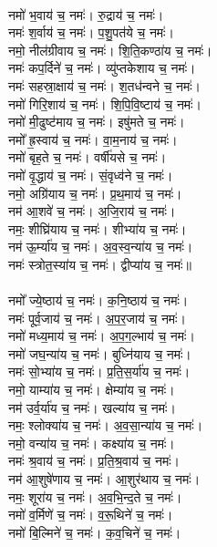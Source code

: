 \\
नमो॑ भ॒वाय॑ च॒ नमः॑। रु॒द्राय॑ च॒ नमः॑।\\
नमः॑ श॒र्वाय॑ च॒ नमः॑। प॒शु॒पत॑ये च॒ नमः॑।\\
नमो॒ नील॑ग्रीवाय च॒ नमः॑। शि॒ति॒कण्ठा॑य च॒ नमः॑।\\
नमः॑ कप॒र्दिने॑ च॒ नमः॑। व्यु॑प्तकेशाय च॒ नमः॑।\\
नमः॑ सहस्रा॒क्षाय॑ च॒ नमः॑। श॒तध॑न्वने च॒ नमः॑।\\
नमो॑ गिरि॒शाय॑ च॒ नमः॑। शि॒पि॒वि॒ष्टाय॑ च॒ नमः॑।\\
नमो॑ मी॒ढुष्ट॑माय च॒ नमः॑। इषु॑मते च॒ नमः॑।\\
नमो᳚ ह्र॒स्वाय॑ च॒ नमः॑। वा॒म॒नाय॑ च॒ नमः॑।\\
नमो॑ बृह॒ते च॒ नमः॑। वर्षी॑यसे च॒ नमः॑।\\
नमो॑ वृ॒द्धाय॑ च॒ नमः॑। सं॒वृध्व॑ने च॒ नमः॑।\\
नमो॒ अग्रि॑याय च॒ नमः॑। प्र॒थ॒माय॑ च॒ नमः॑।\\
नम॑ आ॒शवे॑ च॒ नमः॑। अ॒जि॒राय॑ च॒ नमः॑।\\
नमः॒ शीघ्रि॑याय च॒ नमः॑। शीभ्या॑य च॒ नमः॑।\\
नम॑ ऊ॒र्म्या॑य च॒ नमः॑। अ॒व॒स्व॒न्या॑य च॒ नमः॑।\\
नमः॑ स्त्रोत॒स्या॑य च॒ नमः॑। द्वीप्या॑य च॒ नमः॑॥\\
\\
नमो᳚ ज्ये॒ष्ठाय॑ च॒ नमः॑। क॒नि॒ष्ठाय॑ च॒ नमः॑।\\
नमः॑ पूर्व॒जाय॑ च॒ नमः॑। अ॒प॒र॒जाय॑ च॒ नमः॑।\\
नमो॑ मध्य॒माय॑ च॒ नमः॑। अ॒प॒ग॒ल्भाय॑ च॒ नमः॑।\\
नमो॑ जघ॒न्या॑य च॒ नमः॑। बुध्नि॑याय च॒ नमः॑।\\
नमः॑ सो॒भ्या॑य च॒ नमः॑। प्र॒ति॒स॒र्या॑य च॒ नमः॑।\\
नमो॒ याम्या॑य च॒ नमः॑। क्षेम्या॑य च॒ नमः॑।\\
नम॑ उर्व॒र्या॑य च॒ नमः॑। खल्या॑य च॒ नमः॑।\\
नमः॒ श्लोक्या॑य च॒ नमः॑। अ॒व॒सा॒न्या॑य च॒ नमः॑।\\
नमो॒ वन्या॑य च॒ नमः॑। कक्ष्या॑य च॒ नमः॑।\\
नमः॑ श्र॒वाय॑ च॒ नमः॑। प्र॒ति॒श्र॒वाय॑ च॒ नमः॑।\\
नम॑ आ॒शुषे॑णाय च॒ नमः॑। आ॒शुर॑थाय च॒ नमः॑।\\
नमः॒ शूरा॑य च॒ नमः॑। अ॒व॒भि॒न्द॒ते च॒ नमः॑।\\
नमो॑ व॒र्मिणे॑ च॒ नमः॑। व॒रू॒थिने॑ च॒ नमः॑।\\
नमो॑ बि॒ल्मिने॑ च॒ नमः॑। क॒व॒चिने॑ च॒ नमः॑।\\
